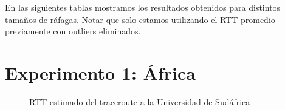 En las siguientes tablas mostramos los resultados obtenidos para distintos tamaños de ráfagas. Notar que solo estamos utilizando el RTT promedio previamente con outliers eliminados.

\newpage
\section{Experimento 1: África}


\begin{landscape}

\end{landscape}

\begin{figure}[H]
  \centering
  \caption{RTT estimado del traceroute a la Universidad de Sudáfrica}
  \label{africaTTL}
\end{figure}

